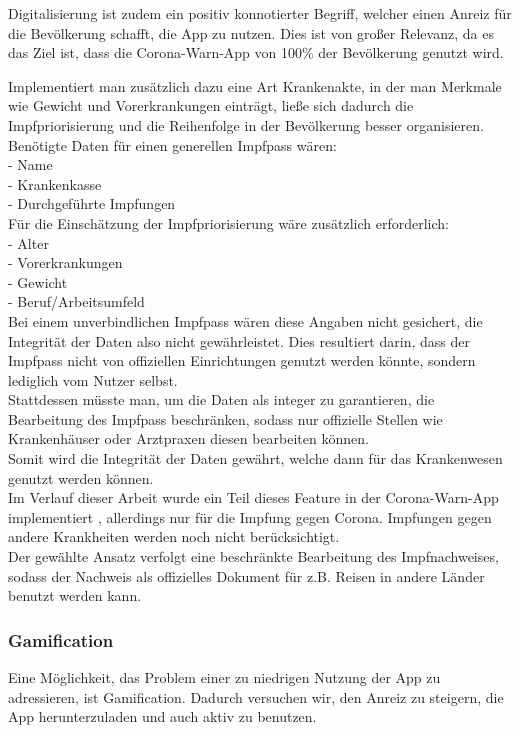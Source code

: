 \documentclass[conference,compsoc]{IEEEtran}
\begin{document}
Digitalisierung ist zudem ein positiv konnotierter Begriff, welcher einen Anreiz für die Bevölkerung schafft, die App zu nutzen. 
Dies ist von großer Relevanz, da es das Ziel ist, dass die Corona-Warn-App von 100\% der Bevölkerung genutzt wird.

Implementiert man zusätzlich dazu eine Art Krankenakte, in der man Merkmale wie Gewicht und Vorerkrankungen einträgt, ließe sich dadurch die Impfpriorisierung und die Reihenfolge in der Bevölkerung besser organisieren.
Benötigte Daten für einen generellen Impfpass wären:\\
- Name \\
- Krankenkasse\\
- Durchgeführte Impfungen\\
Für die Einschätzung der Impfpriorisierung wäre zusätzlich erforderlich:\\
- Alter\\
- Vorerkrankungen \\
- Gewicht \\
- Beruf/Arbeitsumfeld\\
Bei einem unverbindlichen Impfpass wären diese Angaben nicht gesichert, die Integrität der Daten also nicht gewährleistet. Dies resultiert darin, dass der Impfpass nicht von offiziellen Einrichtungen genutzt werden könnte, sondern lediglich vom Nutzer selbst.\\
Stattdessen müsste man, um die Daten als integer zu garantieren, die Bearbeitung des Impfpass beschränken, sodass nur offizielle Stellen wie Krankenhäuser oder Arztpraxen diesen bearbeiten können.\\
Somit wird die Integrität der Daten gewährt, welche dann für das Krankenwesen genutzt werden können.\\
Im Verlauf dieser Arbeit wurde ein Teil dieses Feature in der Corona-Warn-App implementiert \cite{Impfnachweis}, allerdings nur für die Impfung gegen Corona. Impfungen gegen andere Krankheiten werden noch nicht berücksichtigt.\\
Der gewählte Ansatz verfolgt eine beschränkte Bearbeitung des Impfnachweises, sodass der Nachweis als offizielles Dokument für z.B. Reisen in andere Länder benutzt werden kann.\\ 


\subsubsection{Gamification}
Eine Möglichkeit, das Problem einer zu niedrigen Nutzung der App zu adressieren, ist Gamification. Dadurch versuchen wir, den Anreiz zu steigern, die App herunterzuladen und auch aktiv zu benutzen.
\end{document}
